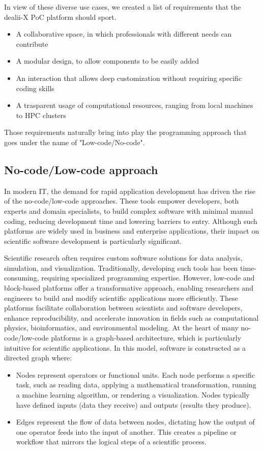 \documentclass[a4paper,12pt]{article}
\begin{document}
In view of these diverse use cases, we created a list of requirements that the dealii-X PoC platform should sport.
\begin{itemize}
    \item A collaborative space, in which professionals with different needs can contribute
    \item A modular design, to allow components to be easily added
    \item An interaction that allows deep customization without requiring specific coding skills
    \item A trasparent usage of computational resources, ranging from local machines to HPC clusters
\end{itemize}

Those requirements naturally bring into play the programming approach that goes under the name of "Low-code/No-code".

\subsection{\textcolor{EUblue}{No-code/Low-code approach}}

In modern IT, the demand for rapid application development has driven the rise of the no-code/low-code approaches. These tools empower developers, both experts and domain specialists, to build complex software with minimal manual coding, reducing development time and lowering barriers to entry. Although such platforms are widely used in business and enterprise applications, their impact on scientific software development is particularly significant.

Scientific research often requires custom software solutions for data analysis, simulation, and visualization. Traditionally, developing such tools has been time-consuming, requiring specialized programming expertise. However, low-code and block-based platforms offer a transformative approach, enabling researchers and engineers to build and modify scientific applications more efficiently. These platforms facilitate collaboration between scientists and software developers, enhance reproducibility, and accelerate innovation in fields such as computational physics, bioinformatics, and environmental modeling.
At the heart of many no-code/low-code platforms is a graph-based architecture, which is particularly intuitive for scientific applications. In this model, software is constructed as a directed graph where:

\begin{itemize}
\item Nodes represent operators or functional units. Each node performs a specific task, such as reading data, applying a mathematical transformation, running a machine learning algorithm, or rendering a visualization. Nodes typically have defined inputs (data they receive) and outputs (results they produce).

\item Edges represent the flow of data between nodes, dictating how the output of one operator feeds into the input of another. This creates a pipeline or workflow that mirrors the logical steps of a scientific process.
\end{itemize}
\end{document}
